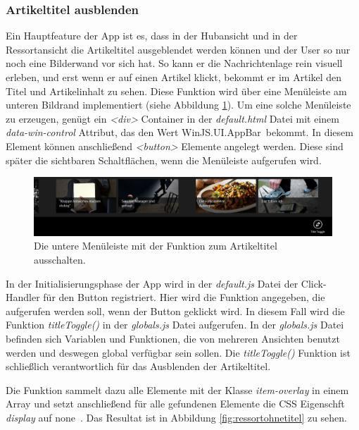 \documentclass[12pt,a4paper,bibtotoc,abstracton]{scrartcl}
\begin{document}
\subsubsection{Artikeltitel ausblenden}
\label{subsubsec:artikeltitelausblenden}
Ein Hauptfeature der App ist es, dass in der Hubansicht und in der Ressortansicht die Artikeltitel ausgeblendet werden können und der User so nur noch eine Bilderwand vor sich hat. So kann er die Nachrichtenlage rein visuell erleben, und erst wenn er auf einen Artikel klickt, bekommt er im Artikel den Titel und Artikelinhalt zu sehen. Diese Funktion wird über eine Menüleiste am unteren Bildrand implementiert (siehe Abbildung \ref{fig:menubartitletoggle}). Um eine solche Menüleiste zu erzeugen, genügt ein \textit{<div>} Container in der \textit{default.html} Datei mit einem \textit{data-win-control} Attribut, das den Wert \glqq WinJS.UI.AppBar\grqq\ bekommt. In diesem Element können anschließend \textit{<button>} Elemente angelegt werden. Diese sind später die sichtbaren Schaltflächen, wenn die Menüleiste aufgerufen wird.

\begin{figure}[h]
	\centering
	\includegraphics[width=\textwidth]{Bilder/Screenshots/app/title_toggle_menu_bar.png} 
	\caption{Die untere Menüleiste mit der Funktion zum Artikeltitel ausschalten.}
	\label{fig:menubartitletoggle}
\end{figure}

In der Initialisierungsphase der App wird in der \textit{default.js} Datei der Click-Handler für den Button registriert. Hier wird die Funktion angegeben, die aufgerufen werden soll, wenn der Button geklickt wird. In diesem Fall wird die Funktion \textit{titleToggle()} in der \textit{globals.js} Datei aufgerufen. In der \textit{globals.js} Datei befinden sich Variablen und Funktionen, die von mehreren Ansichten benutzt werden und deswegen global verfügbar sein sollen. Die \textit{titleToggle()} Funktion ist schließlich verantwortlich für das Ausblenden der Artikeltitel.

Die Funktion sammelt dazu alle Elemente mit der Klasse \textit{item-overlay} in einem Array und setzt anschließend für alle gefundenen Elemente die CSS Eigenschft \textit{display} auf \glqq none\grqq\ . Das Resultat ist in Abbildung \ref{fig:ressortohnetitel} zu sehen.
\end{document}
